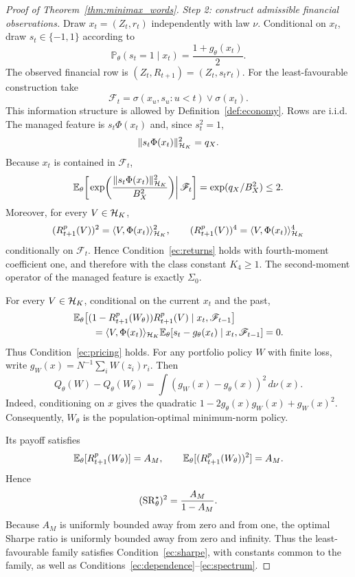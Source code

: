 \begin{proof}[Proof of Theorem~\ref{thm:minimax_words}]
\medskip
\noindent\textit{Step 2: construct admissible financial observations.}
Draw $x_t=(Z_t,r_t)$ independently with law $\nu$. Conditional on $x_t$,
draw $s_t\in\{-1,1\}$ according to
\[
\mathbb P_\theta(s_t=1\mid x_t)
=
\frac{1+g_\theta(x_t)}{2}.
\]
The observed financial row is
$(Z_t,R_{t+1})=(Z_t,s_tr_t)$. For the least-favourable construction take
\[
\mathscr F_t
=
\sigma(x_u,s_u:u<t)\vee\sigma(x_t).
\]
This information structure is allowed by Definition~\ref{def:economy}.
Rows are i.i.d. The managed feature is $s_t\Phi(x_t)$ and, since
$s_t^2=1$,
\[
\|s_t\Phi(x_t)\|_{\mathcal{H}_K}^2=q_X.
\]
Because $x_t$ is contained in $\mathscr F_t$,
\[
\mathbb{E}_\theta\!\left[
\left.
\exp\!\left(
\frac{\|s_t\Phi(x_t)\|_{\mathcal{H}_K}^2}{B_X^2}
\right)
\right|\mathscr F_t
\right]
=
\exp(q_X/B_X^2)
\leq2.
\]
Moreover, for every $V\in\mathcal{H}_K$,
\[
(R^p_{t+1}(V))^2=\langle V,\Phi(x_t)\rangle_{\mathcal{H}_K}^2,
\qquad
(R^p_{t+1}(V))^4=\langle V,\Phi(x_t)\rangle_{\mathcal{H}_K}^4
\]
conditionally on $\mathscr F_t$. Hence
Condition~\ref{ec:returns} holds with fourth-moment coefficient one,
and therefore with the class constant $K_4\geq1$.
The second-moment operator of the managed feature is exactly $\Sigma_0$.

For every $V\in\mathcal{H}_K$, conditional on the current $x_t$ and the past,
\[
\begin{aligned}
&\mathbb{E}_\theta\!\left[
(1-R^p_{t+1}(W_\theta))R^p_{t+1}(V)
\mid x_t,\mathscr F_{t-1}
\right]\\
&\qquad=
\langle V,\Phi(x_t)\rangle_{\mathcal{H}_K}
\mathbb{E}_\theta[s_t-g_\theta(x_t)\mid x_t,\mathscr F_{t-1}]
=0.
\end{aligned}
\]
Thus Condition~\ref{ec:pricing} holds. For any portfolio policy $W$ with
finite loss, write $g_W(x)=N^{-1}\sum_iW(z_i)r_i$. Then
\begin{equation}
Q_\theta(W)-Q_\theta(W_\theta)
=
\int(g_W(x)-g_\theta(x))^2\,d\nu(x).
\label{eq:lower_risk_identity}
\end{equation}
Indeed, conditioning on $x$ gives the quadratic
$1-2g_\theta(x)g_W(x)+g_W(x)^2$. Consequently, $W_\theta$ is the
population-optimal minimum-norm policy.

Its payoff satisfies
\[
\mathbb{E}_\theta[R^p_{t+1}(W_\theta)]=A_M,
\qquad
\mathbb{E}_\theta[(R^p_{t+1}(W_\theta))^2]=A_M.
\]
Hence
\[
(\operatorname{SR}_\theta^\star)^2
=
\frac{A_M}{1-A_M}.
\]
Because $A_M$ is uniformly bounded away from zero and from one, the optimal
Sharpe ratio is uniformly bounded away from zero and infinity. Thus the
least-favourable family satisfies Condition~\ref{ec:sharpe}, with constants
common to the family, as well as Conditions~\ref{ec:dependence}--\ref{ec:spectrum}.


\end{proof}
